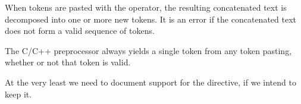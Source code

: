 When tokens are pasted with the \code{##} operator, the resulting concatenated text is decomposed into one or more new tokens.
It is an error if the concatenated text does not form a valid sequence of tokens.

\begin{Note}
The C/C++ preprocessor always yields a single token from any token pasting, whether or not that token is valid.
\end{Note}


\begin{Incomplete}
At the very least we need to document support for the  directive, if we intend to keep it.
\end{Incomplete}

